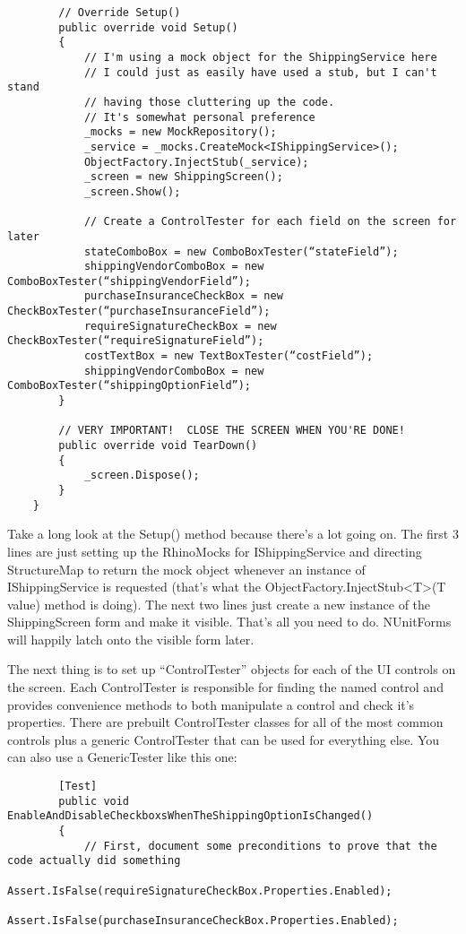 \documentclass{article}
\begin{document}
{\begin{lstlisting}
        // Override Setup()
        public override void Setup()
        {
            // I'm using a mock object for the ShippingService here
            // I could just as easily have used a stub, but I can't stand
            // having those cluttering up the code.
            // It's somewhat personal preference
            _mocks = new MockRepository();
            _service = _mocks.CreateMock<IShippingService>();
            ObjectFactory.InjectStub(_service);
            _screen = new ShippingScreen();
            _screen.Show(); 

            // Create a ControlTester for each field on the screen for later
            stateComboBox = new ComboBoxTester(“stateField”);
            shippingVendorComboBox = new ComboBoxTester(“shippingVendorField”);
            purchaseInsuranceCheckBox = new CheckBoxTester(“purchaseInsuranceField”);
            requireSignatureCheckBox = new CheckBoxTester(“requireSignatureField”);
            costTextBox = new TextBoxTester(“costField”);
            shippingVendorComboBox = new ComboBoxTester(“shippingOptionField”);
        } 

        // VERY IMPORTANT!  CLOSE THE SCREEN WHEN YOU'RE DONE!
        public override void TearDown()
        {
            _screen.Dispose();
        }
    }
\end{lstlisting}	

Take a long look at the Setup() method because there's a lot going on.  The first 3 lines are just setting up the RhinoMocks for IShippingService and directing StructureMap to return the mock object whenever an instance of IShippingService is requested (that's what the ObjectFactory.InjectStub<T>(T value) method is doing).  The next two lines just create a new instance of the ShippingScreen form and make it visible.  That's all you need to do.  NUnitForms will happily latch onto the visible form later.

The next thing is to set up “ControlTester” objects for each of the UI controls on the screen.  Each ControlTester is responsible for finding the named control and provides convenience methods to both manipulate a control and check it's properties.  There are prebuilt ControlTester classes for all of the most common controls plus a generic ControlTester that can be used for everything else.  You can also use a GenericTester like this one:
\newpage
\begin{lstlisting}
        [Test]
        public void EnableAndDisableCheckboxsWhenTheShippingOptionIsChanged()
        {
            // First, document some preconditions to prove that the code actually did something
            Assert.IsFalse(requireSignatureCheckBox.Properties.Enabled);
            Assert.IsFalse(purchaseInsuranceCheckBox.Properties.Enabled); 


\end{lstlisting}}
\end{document}
